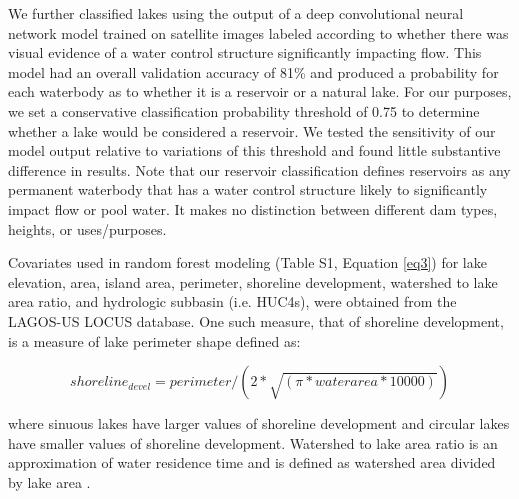 \documentclass[draft]{agujournal2019}
\begin{document}
We further classified lakes using the output of a deep convolutional neural network model trained on satellite images labeled according to whether there was visual evidence of a water control structure significantly impacting flow. This model had an overall validation accuracy of 81\% and produced a probability for each waterbody as to whether it is a reservoir or a natural lake. For our purposes, we set a conservative classification probability threshold of 0.75 to determine whether a lake would be considered a  reservoir. We tested the sensitivity of our model output relative to variations of this threshold and found little substantive difference in results. Note that our reservoir classification defines reservoirs as any permanent waterbody that has a water control structure likely to significantly impact flow or pool water. It makes no distinction between different dam types, heights, or uses/purposes.

Covariates used in random forest modeling (Table S1, Equation \ref{eq3}) for lake elevation, area, island area, perimeter, shoreline development, watershed to lake area ratio, and hydrologic subbasin (i.e. HUC4s), were obtained from the LAGOS-US LOCUS database. One such measure, that of shoreline development, is a measure of lake perimeter shape defined as:

\begin{linenomath*}
      \begin{equation}
            shoreline_{devel} = perimeter / (2 * \sqrt{(\pi * waterarea * 10000)}) \label{eq2}
      \end{equation}
      \end{linenomath*}

\noindent
where sinuous lakes have larger values of shoreline development and circular lakes have smaller values of shoreline development. Watershed to lake area ratio is an approximation of water residence time and is defined as watershed area divided by lake area \cite{timmsGeomorphologyLakeBasins2009}.
\end{document}
